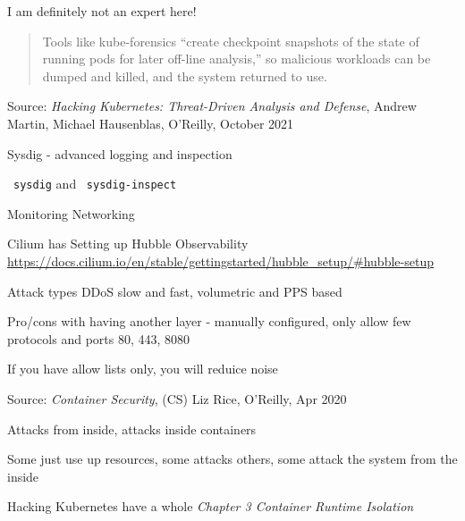\documentclass[Screen16to9,17pt]{foils}
\begin{document}

I am definitely not an expert here!

\begin{quote}
Tools like kube-forensics “create checkpoint snapshots of the state of running pods for later off-line analysis,” so malicious workloads can be dumped and killed, and the system returned to use.
\end{quote}
Source: \emph{Hacking Kubernetes: Threat-Driven Analysis and Defense}, Andrew Martin, Michael Hausenblas, O'Reilly, October 2021


\begin{list2}
\item Sysdig - advanced logging and inspection
\item \faWrench\ \verb+sysdig+ and \faWrench\ \verb+sysdig-inspect+
\end{list2}

Monitoring Networking

\begin{list2}
\item Cilium has Setting up Hubble Observability \\
\url{https://docs.cilium.io/en/stable/gettingstarted/hubble_setup/#hubble-setup}
\item Attack types DDoS slow and fast, volumetric and PPS based
\item Pro/cons with having another layer - manually configured, only allow few protocols and ports 80, 443, 8080
\item If you have allow lists only, you will reduice noise
\end{list2}



Source: \emph{Container Security}, (CS) Liz Rice, O'Reilly, Apr 2020

\begin{list2}
\item Attacks from inside, attacks inside containers
\item Some just use up resources, some attacks others, some attack the system from the inside
\item Hacking Kubernetes have a whole \emph{Chapter 3 Container Runtime Isolation}
\end{list2}


\end{document}
